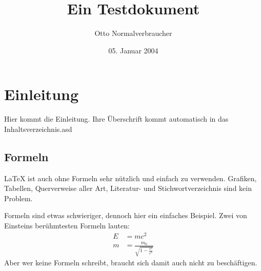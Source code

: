 \documentclass{scrartcl}
\title{Ein Testdokument}
\author{Otto Normalverbraucher}
\date{05. Januar 2004}
\begin{document}
 
\maketitle
\tableofcontents
\section{Einleitung}
 
Hier kommt die Einleitung. Ihre Überschrift kommt
automatisch in das Inhaltsverzeichnis.asd
 
\subsection{Formeln}
 
\LaTeX{} ist auch ohne Formeln sehr nützlich und
einfach zu verwenden. Grafiken, Tabellen,
Querverweise aller Art, Literatur- und
Stichwortverzeichnis sind kein Problem.
 
Formeln sind etwas schwieriger, dennoch hier ein
einfaches Beispiel.  Zwei von Einsteins
berühmtesten Formeln lauten:
\begin{align}
E &= mc^2                                  \\
m &= \frac{m_0}{\sqrt{1-\frac{v^2}{c^2}}}
\end{align}
Aber wer keine Formeln schreibt, braucht sich
damit auch nicht zu beschäftigen.
\end{document}
